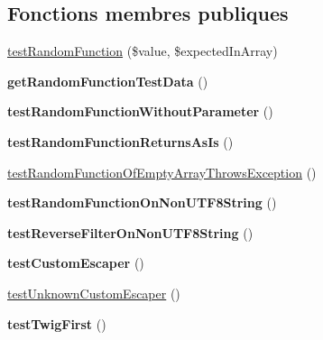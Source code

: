 \subsection*{Fonctions membres publiques}
\begin{DoxyCompactItemize}
\item 
\hyperlink{class_twig___tests___extension___core_test_a2cf0ee0f3689d7f21aa452caf4485f24}{test\+Random\+Function} (\$value, \$expected\+In\+Array)
\item 
{\bfseries get\+Random\+Function\+Test\+Data} ()\hypertarget{class_twig___tests___extension___core_test_a7ca247119691ec11523942572c2b4d1f}{}\label{class_twig___tests___extension___core_test_a7ca247119691ec11523942572c2b4d1f}

\item 
{\bfseries test\+Random\+Function\+Without\+Parameter} ()\hypertarget{class_twig___tests___extension___core_test_ab12a2c1dd88e34e9f4c45565614bce4a}{}\label{class_twig___tests___extension___core_test_ab12a2c1dd88e34e9f4c45565614bce4a}

\item 
{\bfseries test\+Random\+Function\+Returns\+As\+Is} ()\hypertarget{class_twig___tests___extension___core_test_a974f5f012bdb1912b6eeef803b7ec67f}{}\label{class_twig___tests___extension___core_test_a974f5f012bdb1912b6eeef803b7ec67f}

\item 
\hyperlink{class_twig___tests___extension___core_test_a21801c5938e634ccdd605ceee56af7c8}{test\+Random\+Function\+Of\+Empty\+Array\+Throws\+Exception} ()
\item 
{\bfseries test\+Random\+Function\+On\+Non\+U\+T\+F8\+String} ()\hypertarget{class_twig___tests___extension___core_test_a8abef1e3844545d92ac21e747246aded}{}\label{class_twig___tests___extension___core_test_a8abef1e3844545d92ac21e747246aded}

\item 
{\bfseries test\+Reverse\+Filter\+On\+Non\+U\+T\+F8\+String} ()\hypertarget{class_twig___tests___extension___core_test_a8dd0b887f202442a136323815668655f}{}\label{class_twig___tests___extension___core_test_a8dd0b887f202442a136323815668655f}

\item 
{\bfseries test\+Custom\+Escaper} ()\hypertarget{class_twig___tests___extension___core_test_a921206f5f7078abffe5fe18ea08e4116}{}\label{class_twig___tests___extension___core_test_a921206f5f7078abffe5fe18ea08e4116}

\item 
\hyperlink{class_twig___tests___extension___core_test_a170b624419c103232e2ed410f35e7252}{test\+Unknown\+Custom\+Escaper} ()
\item 
{\bfseries test\+Twig\+First} ()\hypertarget{class_twig___tests___extension___core_test_a30d089696860a1574ed5bc2de70d5698}{}\label{class_twig___tests___extension___core_test_a30d089696860a1574ed5bc2de70d5698}


\end{DoxyCompactItemize}
